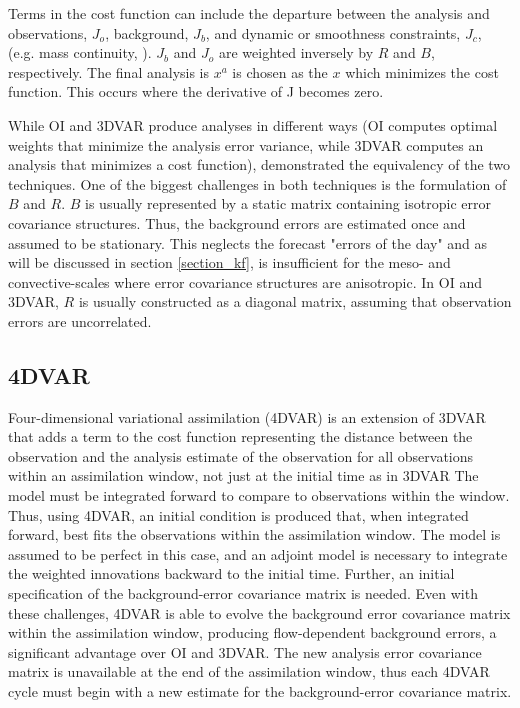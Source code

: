 Terms in the cost function can include the departure between the analysis and observations, \(J_o\), background, \(J_b\), and dynamic or smoothness constraints, \(J_c\), (e.g. mass continuity, \citealt{gaoetal03}). \(J_b\) and \(J_o\) are weighted inversely by \(R\) and \(B\), respectively. The final analysis is  \(x^a\) is chosen as the \(x\) which minimizes the cost function. This occurs where the derivative of J becomes zero.

While OI and 3DVAR produce analyses in different ways (OI computes optimal weights that minimize the analysis error variance, while 3DVAR computes an analysis that minimizes a cost function), \citet{lorenc86} demonstrated the equivalency of the two techniques. One of the biggest challenges in both techniques is the formulation of \(B\) and \(R\). \(B\) is usually represented by a static matrix containing isotropic error covariance structures. Thus, the background errors are estimated once and assumed to be stationary. This neglects the forecast "errors of the day" and as will be discussed in section \ref{section_kf}, is insufficient for the meso- and convective-scales where error covariance structures are anisotropic. In OI and 3DVAR, \(R\) is usually constructed as a diagonal matrix, assuming that observation errors are uncorrelated.

\subsection{4DVAR}
Four-dimensional variational assimilation (4DVAR) is an extension of 3DVAR that adds a term to the cost function representing the distance between the observation and the analysis estimate of the observation for all observations within an assimilation window, not just at the initial time as in 3DVAR \citep{talagrandcourtier87} The model must be integrated forward to compare to observations within the window. Thus, using 4DVAR, an initial condition is produced that, when integrated forward, best fits the observations within the assimilation window. The model is assumed to be perfect in this case, and an adjoint model is necessary to integrate the weighted innovations backward to the initial time. Further, an initial specification of the background-error covariance matrix is needed. Even with these challenges, 4DVAR is able to evolve the background error covariance matrix within the assimilation window, producing flow-dependent background errors, a significant advantage over OI and 3DVAR. The new analysis error covariance matrix is unavailable at the end of the assimilation window, thus each 4DVAR cycle must begin with a new estimate for the background-error covariance matrix.

